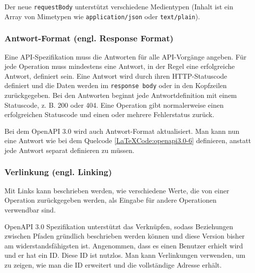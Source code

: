 Der neue \texttt{requestBody} unterstützt verschiedene Medientypen (Inhalt ist ein Array von Mimetypen wie \texttt{application/json} oder \texttt{text/plain}).

\subsubsection{Antwort-Format (engl. Response Format)}

Eine API-Spezifikation muss die Antworten für alle API-Vorgänge angeben. Für jede Operation muss mindestens eine Antwort, in der Regel eine erfolgreiche Antwort, definiert sein. Eine Antwort wird durch ihren HTTP-Statuscode definiert und die Daten werden im \texttt{response body} oder in den Kopfzeilen zurückgegeben. Bei den Antworten beginnt jede Antwortdefinition mit einem Statuscode, z. B. 200 oder 404. Eine Operation gibt normalerweise einen erfolgreichen Statuscode und einen oder mehrere Fehlerstatus zurück\cite{openapiresponsebody17}.

Bei dem OpenAPI 3.0 wird  auch Antwort-Format aktualisiert. Man kann nun eine Antwort wie bei dem Quelcode \ref{LaTeXCode:openapi3.0-6} definieren, anstatt jede Antwort separat definieren zu müssen.

\begin{LaTeXCode}[caption={Open API 3.0 - Antwort-Format},captionpos=b, label=LaTeXCode:openapi3.0-6][numbers=none]
{
	"meinBeispiel": {
		"\$request.body#/url": null,
		"post": {
			"requestBody": {
				"description": "antwort beispiel",
				"content": null,
				"application/json": {
					"schema": null,
					"\$ref": "#/components/schemas/antwortbeispiel"
				},
				"responses": {
					"200": null,
					"description": "antwort funktioniert."
				}
...
\end{LaTeXCode}


\subsubsection{Verlinkung (engl. Linking)}

Mit Links kann beschrieben werden, wie verschiedene Werte, die von einer Operation zurückgegeben werden, als Eingabe für andere Operationen verwendbar sind\cite{openapilinks17}.


OpenAPI 3.0 Spezifikation unterstützt das Verknüpfen, sodass Beziehungen zwischen Pfaden gründlich beschrieben werden können und diese Version bisher am widerstandsfähigsten ist. Angenommen, dass es einen Benutzer erhielt wird und er hat ein ID. Diese ID ist nutzlos. Man kann Verlinkungen verwenden, um zu zeigen, wie man die ID erweitert und die vollständige Adresse erhält.

